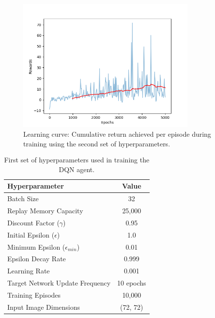\documentclass[a4paper,12pt]{article}
\begin{document}
\begin{figure}
    \includegraphics[width=0.8\textwidth]{first_run.png} 
    \caption{Learning curve: Cumulative return achieved per episode during training using the second set of hyperparameters.}
    \label{fig:learning_curve}
\end{figure}

\begin{table}[ht!]
    \centering
    \begin{tabular}{|l|c|}
        \hline
        \textbf{Hyperparameter} & \textbf{Value} \\
        \hline
        Batch Size & 32 \\
        \rowcolor{lime}
        Replay Memory Capacity & 25,000 \\
        Discount Factor ($\gamma$) & 0.95 \\
        Initial Epsilon ($\epsilon$) & 1.0 \\
        Minimum Epsilon ($\epsilon_{min}$) & 0.01 \\
        Epsilon Decay Rate & 0.999 \\
        Learning Rate & 0.001 \\
        \rowcolor{lime}
        Target Network Update Frequency & 10 epochs \\
        Training Episodes & 10,000 \\
        Input Image Dimensions & (72, 72) \\
        \hline
    \end{tabular}
    \caption{First set of hyperparameters used in training the DQN agent.}
    \label{tab:hyperparameters2}
\end{table}
\end{document}
